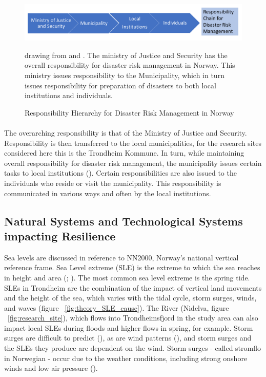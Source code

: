 \begin{figure} [h]
    \centering
    \includegraphics[width=1\textwidth]{fig_theory/responsibility drm.png}
    \caption{Responsibility Hierarchy for Disaster Risk Management in Norway}{ drawing from \cite{rasanen_conceptualizing_2020} and \cite{hanssen_saksframlegg_2013}. The ministry of Justice and Security has the overall responsibility for disaster risk management in Norway. This ministry issues responsibility to the Municipality, which in turn issues responsibility for preparation of disasters to both local institutions and individuals. }
    \label{fig:drm_responsibility}
\end{figure}
\paragraph{}
The overarching responsibility is that of the Ministry of Justice and Security. Responsibility is then transferred to the local municipalities, for the research sites considered here this is the Trondheim Kommune. In turn, while maintaining overall responsibility for disaster risk management, the municipality issues certain tasks to local institutions (\cite{hanssen_saksframlegg_2013}). Certain responsibilities are also issued to the individuals who reside or visit the municipality. This responsibility is communicated in various ways and often by the local institutions. 





\subsection{Natural Systems and Technological Systems impacting Resilience }
Sea levels are discussed in reference to NN2000, Norway's national vertical reference frame. Sea Level extreme (SLE) is the extreme to which the sea reaches in height and area (\cite{nilsen_sealevelchangefornorway_nodate}; \cite{kartverket_se_2020}). The most common sea level extreme is the spring tide. SLEs in Trondheim are the combination of the impact of vertical land movements and the height of the sea, which varies with the tidal cycle, storm surges, winds, and waves \cite{hanssen-bauer_climate_2017} (figure ~\ref{fig:theory_SLE_cause}). The River (Nidelva, figure ~\ref{fig:research_site}), which flows into Trondheimsfjord in the study area can also impact local SLEs during floods and higher flows in spring, for example. Storm surges are difficult to predict (\cite{nilsen_sealevelchangefornorway_nodate}), as are wind patterns (\cite{rod_three_2015}), and storm surges and the SLEs they produce are dependent on the wind. Storm surges - called stromflo in Norwegian -  occur due to the weather conditions, including strong onshore winds and low air pressure (\cite{hanssen_saksframlegg_2013}). 


